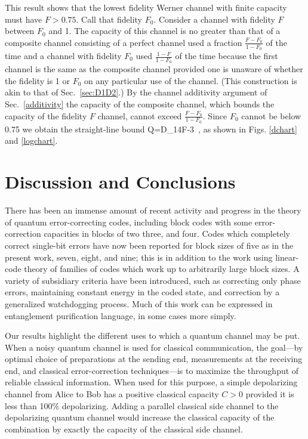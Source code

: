 This result shows that the lowest fidelity Werner channel with
finite capacity must have $F>0.75$.  Call that fidelity $F_0$.
Consider a channel with fidelity $F$ between $F_0$ and 1.  The capacity
of this channel is no greater than that of a composite 
channel consisting of a perfect channel used a fraction
$\frac{F-F_0}{1-F_0}$ of the time and a channel with fidelity $F_0$
used $\frac{1-F}{1-F_0}$ of the time because the first channel
is the same as the composite channel provided one is unaware of
whether the fidelity is 1 or $F_0$ on any particular use
of the channel.  (This construction is akin to that of Sec.~\ref{sec:D1D2}.)
By the channel additivity argument of Sec.~\ref{additivity} the
capacity of the composite channel, which bounds the capacity of the
fidelity $F$ channel, cannot exceed $\frac{F-F_0}{1-F_0}.$  Since
$F_0$ cannot be below 0.75 we obtain the straight-line bound 
\beq
Q=D_1\le 4F-3\ ,
\eeq
as shown in Figs. \ref{dchart} and \ref{logchart}. 

 
\section{Discussion and Conclusions}
\label{sec:theend}
 
There has been an immense amount of recent activity and progress
in the theory of quantum error-correcting codes, including
block codes with some error-correction capacities in blocks of
two\cite{newest} three\cite{EM,Sam}, and four\cite{newest}.  Codes
which completely correct single-bit errors have now been reported for
block sizes of five as in the present work\cite{Laflamme},
seven\cite{Steane}, eight\cite{balance}, and nine\cite{shellgame};
this is in addition to the work using linear-code theory of families
of codes which work up to arbitrarily large block
sizes\cite{CS,Steane}.  A variety of subsidiary criteria have been
introduced, such as correcting only phase errors,
maintaining constant energy in the coded state, and correction by a
generalized watchdogging process.  Much of this work can be
expressed in entanglement purification language, in some cases
more simply.
 
Our results highlight the different uses to which a quantum channel may
be put.  When a noisy quantum channel is used for classical
communication, the goal---by optimal choice of preparations at the
sending end, measurements at the receiving end, and classical
error-correction techniques---is to maximize the throughput of reliable
classical information.  When used for this purpose, a simple
depolarizing channel from Alice to Bob has a positive classical capacity
$C>0$ provided it is less than 100\% depolarizing.  Adding a parallel classical
side channel to the depolarizing quantum channel would increase the
classical capacity of the combination by exactly the capacity of the
classical side channel.
 
